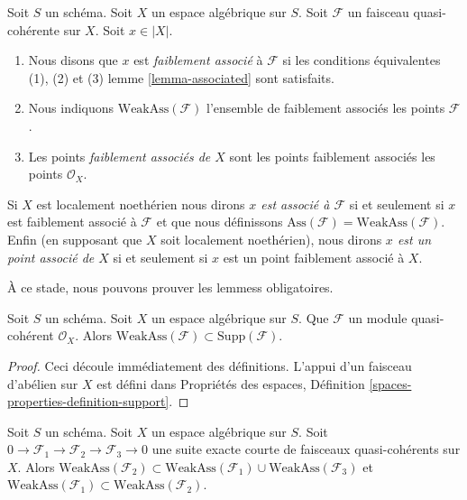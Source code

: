 \begin{definition}
\label{definition-weakly-associated}
Soit $S$ un schéma. Soit $X$ un espace algébrique sur $S$.
Soit $\mathcal{F}$ un faisceau quasi-cohérente sur $X$.
Soit $x \in |X|$.
\begin{enumerate}
\item Nous disons que $x$ est {\it  faiblement associé} à $\mathcal{F}$
si les conditions équivalentes (1), (2) et (3)
lemme \ref{lemma-associated} sont satisfaits.
\item Nous indiquons $\text{WeakAss}(\mathcal{F})$ l'ensemble de faiblement associés
les points $\mathcal{F}$.
\item Les points {\it  faiblement associés de $X$} sont les points faiblement associés
les points $\mathcal{O}_X$.
\end{enumerate}
Si $X$ est localement noethérien nous dirons
{\it $x$ est associé à $\mathcal{F}$}
si et seulement si $x$ est faiblement associé à $\mathcal{F}$ et que nous définissons
$\text{Ass}(\mathcal{F}) = \text{WeakAss}(\mathcal{F})$.
Enfin (en supposant que $X$ soit localement noethérien),
nous dirons {\it $x$ est un point associé de $X$} si et seulement si
$x$ est un point faiblement associé à $X$.
\end{definition}

\noindent
À ce stade, nous pouvons prouver les lemmess obligatoires.

\begin{lemma}
\label{lemma-weakly-ass-support}
Soit $S$ un schéma. Soit $X$ un espace algébrique sur $S$.
Que $\mathcal{F}$ un module quasi-cohérent $\mathcal{O}_X$.
Alors $\text{WeakAss}(\mathcal{F}) \subset \text{Supp}(\mathcal{F})$.
\end{lemma}

\begin{proof}
Ceci découle immédiatement des définitions. L'appui d'un faisceau d'abélien
sur $X$ est défini dans Propriétés des espaces, Définition
\ref{spaces-properties-definition-support}.
\end{proof}

\begin{lemma}
\label{lemma-ses-weakly-ass}
Soit $S$ un schéma. Soit $X$ un espace algébrique sur $S$.
Soit $0 \to \mathcal{F}_1 \to \mathcal{F}_2 \to \mathcal{F}_3 \to 0$
une suite exacte courte de faisceaux quasi-cohérents sur $X$.
Alors
$\text{WeakAss}(\mathcal{F}_2) \subset
\text{WeakAss}(\mathcal{F}_1) \cup \text{WeakAss}(\mathcal{F}_3)$
et
$\text{WeakAss}(\mathcal{F}_1) \subset \text{WeakAss}(\mathcal{F}_2)$.
\end{lemma}

